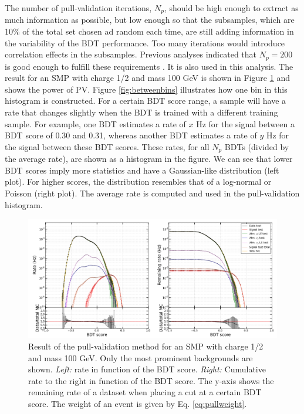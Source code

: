 The number of pull-validation iterations, $N_p$, should be high enough to extract as much information as possible, but low enough so that the subsamples, which are 10\% of the total set chosen ad random each time, are still adding information in the variability of the BDT performance. Too many iterations would introduce correlation effects in the subsamples. Previous analyses indicated that $N_p = 200$ is good enough to fulfill these requirements \cite{Aartsen:2016fep,Aartsen:2015exf}. It is also used in this analysis. The result for an SMP with charge 1/2 and mass 100 GeV is shown in Figure \ref{fig:pullval} and shows the power of PV. Figure \ref{fig:betweenbins} illustrates how one bin in this histogram is constructed. For a certain BDT score range, a sample will have a rate that changes slightly when the BDT is trained with a different training sample. For example, one BDT estimates a rate of $x$ Hz for the signal between a BDT score of 0.30 and 0.31, whereas another BDT estimates a rate of $y$ Hz for the signal between these BDT scores. These rates, for all $N_p$ BDTs (divided by the average rate), are shown as a histogram in the figure. We can see that lower BDT scores imply more statistics and have a Gaussian-like distribution (left plot). For higher scores, the distribution resembles that of a log-normal or Poisson (right plot). The average rate is computed and used in the pull-validation histogram.\\
 
\begin{figure}
\centering
\includegraphics[width=\textwidth]{chapter8/img/pullval_result2_signal_m_100_charge1ovr2.png}
\caption{Result of the pull-validation method for an SMP with charge 1/2 and mass 100 GeV. Only the most prominent backgrounds are shown. \textit{Left: }rate in function of the BDT score. \textit{Right: }Cumulative rate to the right in function of the BDT score. The y-axis shows the remaining rate of a dataset when placing a cut at a certain BDT score. The weight of an event is given by Eq. \ref{eq:pullweight}.}
\label{fig:pullval}
\end{figure}

